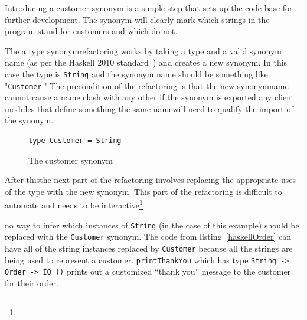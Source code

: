  \DIFaddend Introducing a customer synonym is a simple step that sets up the code base for further development. The synonym will clearly mark which strings in the program stand for customers and which do not.

The \DIFdelbegin {}\DIFdelend \DIFaddbegin {}\DIFaddend a type synonym\DIFaddbegin {}\DIFaddend refactoring works by taking a type and a valid synonym name (as per the Haskell 2010 standard~\citep{haskell2010}) and creates a new synonym. In this case the type is \texttt{String} and the synonym name should be something like "\texttt{Customer}." The \DIFdelbegin {}\DIFdelend \DIFaddbegin {}\DIFaddend precondition of the refactoring is that the new synonym\DIFaddbegin {}\DIFaddend name cannot cause a name clash with any other \DIFdelbegin {}\DIFdelend \DIFaddbegin {}\DIFaddend if the synonym is exported \DIFdelbegin {}\DIFdelend \DIFaddbegin {}\DIFaddend any client modules that define something \DIFdelbegin {}\DIFdelend \DIFaddbegin {}\DIFaddend the same name\DIFaddbegin {}\DIFaddend will need to qualify the import of the synonym. 

\begin{figure}[t]
\begin{lstlisting}
type Customer = String
\end{lstlisting}
\caption{The customer synonym}
\end{figure}

After this\DIFaddbegin \DIFadd{, }\DIFaddend the next part of the refactoring involves replacing the appropriate uses of the type with the new synonym. This part of the refactoring is difficult to automate and needs to be interactive\DIFdelbegin \footnote{}%
\addtocounter{footnote}{-1}%
\DIFdelend \DIFaddbegin {}\DIFaddend no way to infer which instances of \texttt{String} (in the case of this example) should be replaced with the \texttt{Customer} synonym. The code from listing~\ref{haskellOrder} can have all of the string instances replaced by \texttt{Customer} because all the strings are being used to represent a customer. \DIFdelbegin {}\DIFdelend \DIFaddbegin {}\DIFaddend \texttt{printThankYou} \DIFaddbegin {}\DIFaddend which has type \texttt{String -> Order -> IO ()} \DIFdelbegin {}\DIFdelend \DIFaddbegin {}\DIFaddend prints out a customized ``thank you'' message to the customer for their order. 

